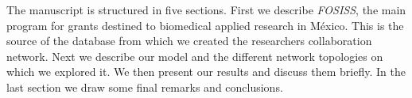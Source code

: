\documentclass[11pt]{article}
\begin{document}
The manuscript is structured in five sections. First we describe
\textit{FOSISS}, the main program for grants destined to biomedical applied
research in M\'exico. This is the source of the
database from which we created the researchers collaboration network. Next we
describe our model
and the different network topologies on which we explored it.
We then present our results and discuss them briefly. In the last section
we draw some final remarks and conclusions.








\end{document}
